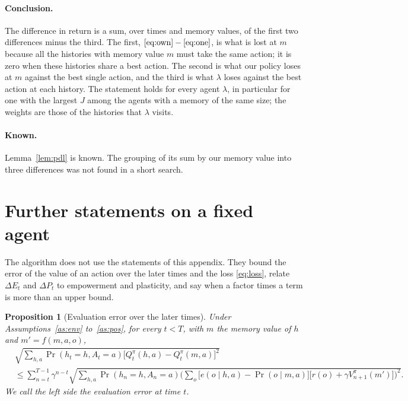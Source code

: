 \documentclass{article}
\newcounter{algo}
\newtheorem{proposition}{Proposition}[section]
\theoremstyle{definition}
\newcommand{\dE}{\Delta E}
\newcommand{\dP}{\Delta P}
\begin{document}
\paragraph{Conclusion.} The difference in return is a sum, over times and memory values, of the first two differences minus the third. The first, $\eqref{eq:own}-\eqref{eq:one}$, is what is lost at $m$ because all the histories with memory value $m$ must take the same action; it is zero when these histories share a best action. The second is what our policy loses at $m$ against the best single action, and the third is what $\lambda$ loses against the best action at each history. The statement holds for every agent $\lambda$, in particular for one with the largest $J$ among the agents with a memory of the same size; the weights are those of the histories that $\lambda$ visits.

\paragraph{Known.} Lemma~\ref{lem:pdl} is known. The grouping of its sum by our memory value into three differences was not found in a short search.

\section{Further statements on a fixed agent}\label{sec:further}

The algorithm does not use the statements of this appendix. They bound the error of the value of an action over the later times and the loss \eqref{eq:loss}, relate $\dE_t$ and $\dP_t$ to empowerment and plasticity, and say when a factor times a term is more than an upper bound.

\begin{proposition}[Evaluation error over the later times]\label{prop:eval}
Under Assumptions~\ref{as:env} to~\ref{as:pos}, for every $t<T$, with $m$ the memory value of $h$ and $m'=f(m,a,o)$,
\begin{align*}
&\sqrt{\sum_{h,a}\Pr(h_t=h,A_t=a)\big[Q^\pi_t(h,a)-Q^\pi_t(m,a)\big]^2}\\
&\le\sum_{n=t}^{T-1}\gamma^{n-t}\sqrt{\sum_{h,a}\Pr(h_n=h,A_n=a)\Big(\sum_o\big[e(o\mid h,a)-\Pr(o\mid m,a)\big]\big[r(o)+\gamma V^\pi_{n+1}(m')\big]\Big)^2}.
\end{align*}
We call the left side the evaluation error at time $t$.
\end{proposition}
\end{document}
